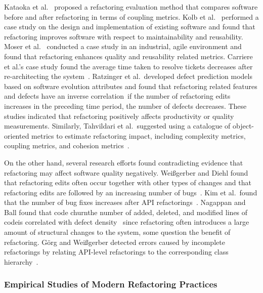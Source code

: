\documentclass[runningheads,a4paper]{llncs}
\begin{document}
Kataoka et al.~\cite{Kataoka2002:metric} proposed a refactoring evaluation method that compares software before and after refactoring in terms of coupling metrics. Kolb et al.~\cite{Kolb2006:refactoring} performed a case study on the design and implementation of existing software and found that refactoring improves software with respect to maintainability and reusability. Moser et al.~\cite{Moser2006:refactoring} conducted a case study in an industrial, agile environment and found that refactoring enhances quality and reusability related metrics. Carriere et al.'s case study found the average time taken to resolve tickets decreases after re-architecting the system~\cite{Carriere2010:architecture}. Ratzinger et al.~developed defect prediction models based on software evolution attributes and found that refactoring related features and defects have an inverse correlation~\cite{Ratzinger2008:refactor}\textemdash if the number of refactoring edits increases in the preceding time period, the number of defects decreases. These studies indicated that refactoring positively affects productivity or quality measurements. Similarly, Tahvildari et al.~suggested using a catalogue of object-oriented metrics to estimate refactoring impact, including complexity metrics, coupling metrics, and cohesion metrics~\cite{Tahvildari2003:MAE}. 

On the other hand, several research efforts found contradicting evidence that refactoring may affect software quality negatively. Wei{\ss}gerber and Diehl found that refactoring edits often occur together with other types of changes and that refactoring edits are followed by an increasing number of bugs~\cite{Weissgerber2006:refactor}.  Kim et al.~found that the number of bug fixes increases after API refactorings~\cite{Kim2011:refactorbug}.  Nagappan and Ball found that code churn\textemdash the number of added, deleted, and modified lines of code\textemdash is correlated with defect density~\cite{Nagappan2005}\textemdash{} since refactoring often introduces a large amount of structural changes to the system, some question the benefit of refactoring. G{\"o}rg and Wei{\ss}gerber detected errors caused by incomplete refactorings by relating API-level refactorings to the corresponding class hierarchy~\cite{Weissgerber2006:refactor}.  

\subsubsection{Empirical Studies of Modern Refactoring Practices} 
\end{document}

